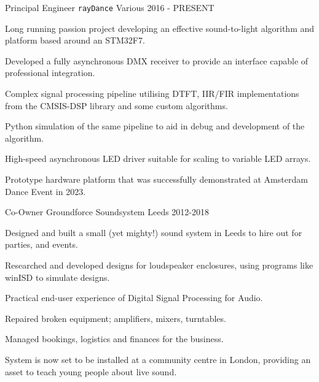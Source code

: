 

\begin{cventries}

  \cventry
    {Principal Engineer} %
    {\texttt{rayDance}} %
    {Various} %
    {2016 - PRESENT} %
    {
      Long running passion project developing an effective sound-to-light algorithm and platform based around an STM32F7.
      \begin{cvitems} %
        \item {Developed a fully asynchronous DMX receiver to provide an interface capable of professional integration.}
        \item {Complex signal processing pipeline utilising DTFT, IIR/FIR implementations from the CMSIS-DSP library and some custom algorithms.}
        \item {Python simulation of the same pipeline to aid in debug and development of the algorithm.}
        \item {High-speed asynchronous LED driver suitable for scaling to variable LED arrays.}
        \item {Prototype hardware platform that was successfully demonstrated at Amsterdam Dance Event in 2023.}
      \end{cvitems}
    }

    \cventry
    {Co-Owner}
    {Groundforce Soundsystem}
    {Leeds}
    {2012-2018}
    {Designed and built a small (yet mighty!) sound system in Leeds to hire out for parties, and events.
    \begin{cvitems}
        \item Researched and developed designs for loudspeaker enclosures, using programs like winISD to simulate designs.
        \item Practical end-user experience of Digital Signal Processing for Audio.
        \item Repaired broken equipment; amplifiers, mixers, turntables.
        \item Managed bookings, logistics and finances for the business.
        \item System is now set to be installed at a community centre in London, providing an asset to teach young people about live sound.
    \end{cvitems}
    }

\end{cventries}
